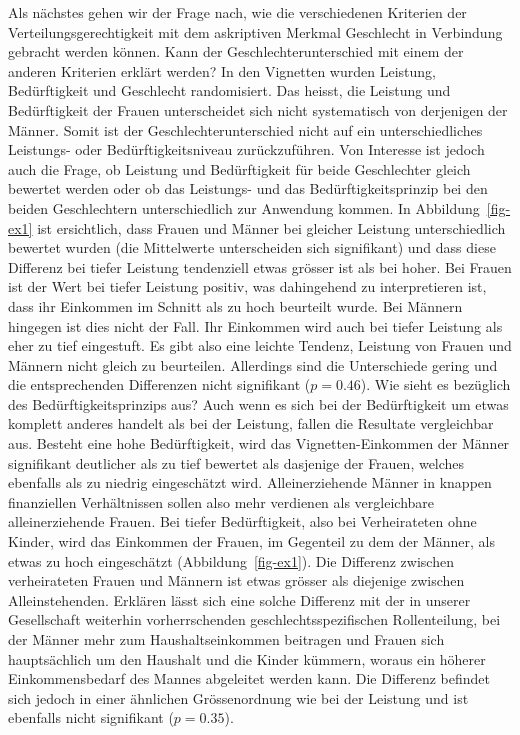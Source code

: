 \documentclass[a4paper,12pt]{article}
\begin{document}
Als nächstes gehen wir der Frage nach, wie die verschiedenen Kriterien der
Verteilungsgerechtigkeit mit dem askriptiven Merkmal Geschlecht in Verbindung
gebracht werden können. Kann der Geschlechterunterschied mit einem der anderen
Kriterien erklärt werden? In den Vignetten wurden Leistung, Bedürftigkeit und
Geschlecht randomisiert. Das heisst, die Leistung und Bedürftigkeit der Frauen
unterscheidet sich nicht systematisch von derjenigen der Männer. Somit ist der
Geschlechterunterschied nicht auf ein unterschiedliches Leistungs- oder
Bedürftigkeitsniveau zurückzuführen. Von Interesse ist jedoch auch die Frage,
ob Leistung und Bedürftigkeit für beide Geschlechter gleich bewertet werden
oder ob das Leistungs- und das Bedürftigkeitsprinzip bei den beiden
Geschlechtern unterschiedlich zur Anwendung kommen. In Abbildung~\ref{fig-ex1}
ist ersichtlich, dass Frauen und Männer bei gleicher Leistung unterschiedlich
bewertet wurden (die Mittelwerte unterscheiden sich signifikant) und dass diese
Differenz bei tiefer Leistung tendenziell etwas grösser ist als bei hoher. Bei
Frauen ist der Wert bei tiefer Leistung positiv, was dahingehend zu
interpretieren ist, dass ihr Einkommen im Schnitt als zu hoch beurteilt wurde.
Bei Männern hingegen ist dies nicht der Fall. Ihr Einkommen wird auch bei
tiefer Leistung als eher zu tief eingestuft. Es gibt also eine leichte Tendenz,
Leistung von Frauen und Männern nicht gleich zu beurteilen. Allerdings sind die
Unterschiede gering und die entsprechenden Differenzen nicht signifikant
($p=0.46$). Wie sieht es bezüglich des Bedürftigkeitsprinzips aus? Auch wenn es
sich bei der Bedürftigkeit um etwas komplett anderes handelt als bei der
Leistung, fallen die Resultate vergleichbar aus. Besteht eine hohe
Bedürftigkeit, wird das Vignetten-Einkommen der Männer signifikant deutlicher
als zu tief bewertet als dasjenige der Frauen, welches ebenfalls als zu niedrig
eingeschätzt wird. Alleinerziehende Männer in knappen finanziellen
Verhältnissen sollen also mehr verdienen als vergleichbare alleinerziehende
Frauen. Bei tiefer Bedürftigkeit, also bei Verheirateten ohne Kinder, wird das
Einkommen der Frauen, im Gegenteil zu dem der Männer, als etwas zu hoch
eingeschätzt (Abbildung~\ref{fig-ex1}). Die Differenz zwischen verheirateten
Frauen und Männern ist etwas grösser als diejenige zwischen Alleinstehenden.
Erklären lässt sich eine solche Differenz mit der in unserer Gesellschaft
weiterhin vorherrschenden geschlechtsspezifischen Rollenteilung, bei der Männer
mehr zum Haushaltseinkommen beitragen und Frauen sich hauptsächlich um den
Haushalt und die Kinder kümmern, woraus ein höherer Einkommensbedarf des Mannes
abgeleitet werden kann. Die Differenz befindet sich jedoch in einer ähnlichen
Grössenordnung wie bei der Leistung und ist ebenfalls nicht signifikant
($p=0.35$).
\end{document}
